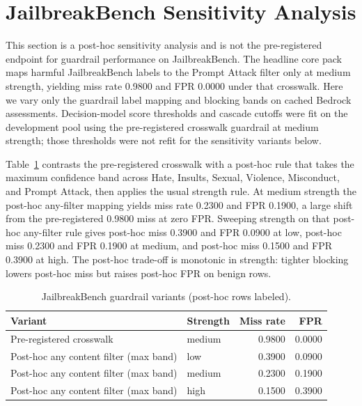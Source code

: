 \section{JailbreakBench Sensitivity Analysis}
\label{sec:jbb-sensitivity}

This section is a post-hoc sensitivity analysis and is not the pre-registered endpoint for guardrail performance on JailbreakBench.
The headline core pack maps harmful JailbreakBench labels to the Prompt Attack filter only at medium strength, yielding miss rate 0.9800 and FPR 0.0000 under that crosswalk.
Here we vary only the guardrail label mapping and blocking bands on cached Bedrock assessments.
Decision-model score thresholds and cascade cutoffs were fit on the development pool using the pre-registered crosswalk guardrail at medium strength; those thresholds were not refit for the sensitivity variants below.

Table~\ref{tab:jbb-sens-guardrail} contrasts the pre-registered crosswalk with a post-hoc rule that takes the maximum confidence band across Hate, Insults, Sexual, Violence, Misconduct, and Prompt Attack, then applies the usual strength rule.
At medium strength the post-hoc any-filter mapping yields miss rate 0.2300 and FPR 0.1900, a large shift from the pre-registered 0.9800 miss at zero FPR.
Sweeping strength on that post-hoc any-filter rule gives post-hoc miss 0.3900 and FPR 0.0900 at low, post-hoc miss 0.2300 and FPR 0.1900 at medium, and post-hoc miss 0.1500 and FPR 0.3900 at high.
The post-hoc trade-off is monotonic in strength: tighter blocking lowers post-hoc miss but raises post-hoc FPR on benign rows.

\begin{table}[t]
  \centering
  \caption{JailbreakBench guardrail variants (post-hoc rows labeled).}
  \label{tab:jbb-sens-guardrail}
  \begin{tabular}{llrr}
    \toprule
    Variant & Strength & Miss rate & FPR \\
    \midrule
    Pre-registered crosswalk & medium & 0.9800 & 0.0000 \\
    \midrule
    Post-hoc any content filter (max band) & low & 0.3900 & 0.0900 \\
    Post-hoc any content filter (max band) & medium & 0.2300 & 0.1900 \\
    Post-hoc any content filter (max band) & high & 0.1500 & 0.3900 \\
    \bottomrule
  \end{tabular}
\end{table}

